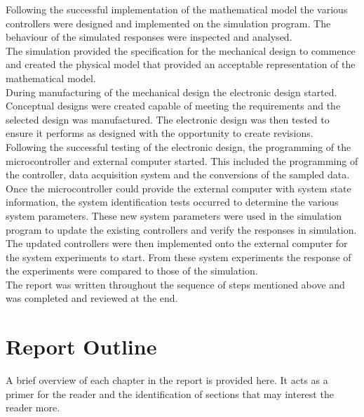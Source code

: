 Following the successful implementation of the mathematical model the various controllers were designed and implemented on the simulation program. The behaviour of the simulated responses were inspected and analysed.\\

The simulation provided the specification for the mechanical design to commence and created the physical model that provided an acceptable representation of the mathematical model.\\

During manufacturing of the mechanical design the electronic design started. Conceptual designs were created capable of meeting the requirements and the selected design was manufactured. The electronic design was then tested to ensure it performs as designed with the opportunity to create revisions.\\

Following the successful testing of the electronic design, the programming of the microcontroller and external computer started. This included the programming of the controller, data acquisition system and the conversions of the sampled data.\\

Once the microcontroller could provide the external computer with system state information, the system identification tests occurred to determine the various system parameters. These new system parameters were used in the simulation program to update the existing controllers and verify the responses in simulation.\\

The updated controllers were then implemented onto the external computer for the system experiments to start. From these system experiments the response of the experiments were compared to those of the simulation.\\

The report was written throughout the sequence of steps mentioned above and was completed and reviewed at the end.


\section{Report Outline}

A brief overview of each chapter in the report is provided here. It acts as a primer for the reader and the identification of sections that may interest the reader more.\\

